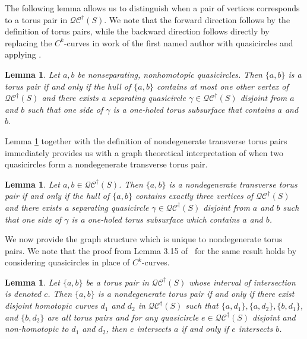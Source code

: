 \documentclass[12pt,a4paper]{amsart}
\theoremstyle{definition}
\theoremstyle{plain}
\newtheorem{lemma}[theorem]{Lemma}
\numberwithin{equation}{section}
\newcommand{\qcg}{\mathcal{QC}^{\dagger}}
\begin{document}
The following lemma allows us to distinguish when a pair of vertices corresponds to a torus pair in $\qcg(S)$.
We note that the forward direction follows by the definition of torus pairs, while the backward direction follows directly by replacing the $C^k$-curves in work of the first named author \cite{booth2024automorphisms} with quasicircles and applying \cite[Lemma 3.14]{booth2024automorphisms}.

\begin{lemma}\label{Lem:TorusPairClassification}
    Let $a, b$ be nonseparating, nonhomotopic quasicircles.
    Then $\{a,b\}$ is a torus pair if and only if the hull of $\{a,b\}$ contains at most one other vertex of  $\qcg(S)$ and there exists a separating quasicircle $\gamma \in \qcg(S)$ disjoint from $a$ and $b$ such that one side of $\gamma$ is a one-holed torus subsurface that contains $a$ and $b$.
\end{lemma}


Lemma \ref{Lem:TorusPairClassification} together with the definition of nondegenerate transverse torus pairs immediately provides us with a graph theoretical interpretation of when two quasicircles form a nondegenerate transverse torus pair.

\begin{lemma}\label{Lem:NonDegenNonTransTorusPairClassification}
    Let $a, b \in \qcg(S)$.
    Then $\{a,b\}$ is a nondegenerate transverse torus pair if and only if the hull of $\{a,b\}$ contains exactly three vertices of  $\qcg(S)$ and there exists a separating quasicircle $\gamma \in \qcg(S)$ disjoint from $a$ and $b$ such that one side of $\gamma$ is a one-holed torus subsurface which contains $a$ and $b$.
\end{lemma}

We now provide the graph structure which is unique to nondegenerate torus pairs.
We note that the proof from Lemma 3.15 of~\cite{booth2024automorphisms} for the same result holds by considering quasicircles in place of $C^k$-curves.

\begin{lemma}
   Let $\{a,b\}$ be a torus pair in $\qcg(S)$ whose interval of intersection is denoted $c$.
   Then $\{a,b\}$ is a nondegenerate torus pair if and only if there exist disjoint homotopic curves $d_1$ and $d_2$ in $\qcg(S)$ such that $\{a,d_1\}, \{a,d_2\},\{b,d_1\}$, and $\{b,d_2\}$ are all torus pairs and for any quasicircle $e \in \qcg(S)$ disjoint and non-homotopic to $d_1$ and $d_2$, then $e$ intersects $a$ if and only if $e$ intersects $b$.
\end{lemma}
\end{document}
